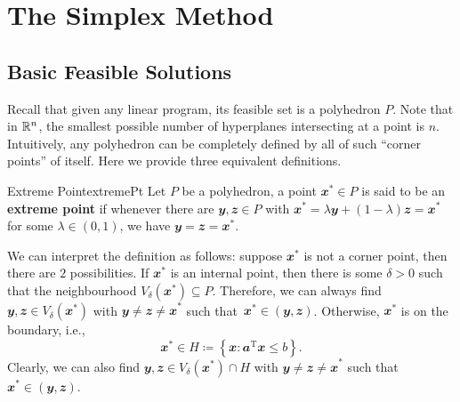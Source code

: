 \documentclass[math, code]{amznotes}
\theoremstyle{remark}
\begin{document}
\chapter{The Simplex Method}
\section{Basic Feasible Solutions}
Recall that given any linear program, its feasible set is a polyhedron $P$. Note that in $\mathbb{R}^n$, the smallest possible number of hyperplanes intersecting at a point is $n$. Intuitively, any polyhedron can be completely defined by all of such ``corner points'' of itself. Here we provide three equivalent definitions.
\begin{dfnbox}{Extreme Point}{extremePt}
    Let $P$ be a polyhedron, a point $\mathbfit{x}^* \in P$ is said to be an {\color{red} \textbf{extreme point}} if whenever there are $\mathbfit{y}, \mathbfit{z} \in P$ with $\mathbfit{x}^* = \lambda\mathbfit{y} + (1 - \lambda)\mathbfit{z} = \mathbfit{x}^*$ for some $\lambda \in (0, 1)$, we have $\mathbfit{y = z = x}^*$.
\end{dfnbox}
We can interpret the definition as follows: suppose $\mathbfit{x}^*$ is not a corner point, then there are $2$ possibilities. If $\mathbfit{x}^*$ is an internal point, then there is some $\delta > 0$ such that the neighbourhood $V_\delta(\mathbfit{x}^*) \subseteq P$. Therefore, we can always find $\mathbfit{y}, \mathbfit{z} \in V_\delta(\mathbfit{x}^*)$ with $\mathbfit{y \neq z \neq x}^*$ such that~$\mathbfit{x}^* \in (\mathbfit{y}, \mathbfit{z})$. Otherwise, $\mathbfit{x}^*$ is on the boundary, i.e.,
\begin{equation*}
    \mathbfit{x}^* \in H \coloneqq \left\{\mathbfit{x} \colon \mathbfit{a}^{\mathrm{T}}\mathbfit{x} \leq b\right\}.
\end{equation*}
Clearly, we can also find $\mathbfit{y}, \mathbfit{z} \in V_\delta(\mathbfit{x}^*) \cap H$ with $\mathbfit{y \neq z \neq x}^*$ such that $\mathbfit{x}^* \in (\mathbfit{y}, \mathbfit{z})$.
\end{document}

